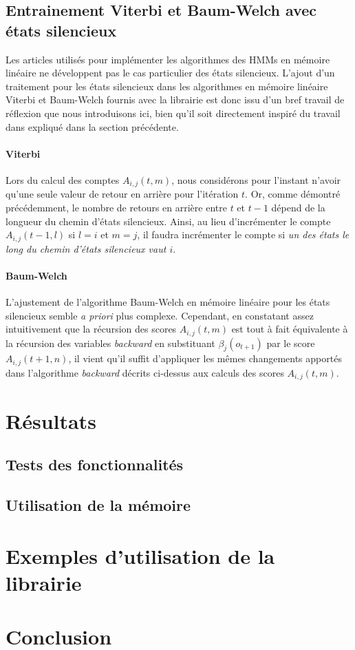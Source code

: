 \documentclass[letterpaper]{article}
\begin{document}
\subsection{Entrainement Viterbi et Baum-Welch avec états silencieux}
Les articles utilisés pour implémenter les algorithmes des HMMs en mémoire linéaire ne développent pas le cas particulier des états silencieux. L'ajout d'un traitement pour les états silencieux dans les algorithmes en mémoire linéaire Viterbi et Baum-Welch fournis avec la librairie est donc issu d'un bref travail de réflexion que nous introduisons ici, bien qu'il soit directement inspiré du travail dans \cite{Durbin} expliqué dans la section précédente.

\paragraph{Viterbi}
Lors du calcul des comptes $A_{i,j}(t, m)$, nous considérons pour l'instant n'avoir qu'une seule valeur de retour en arrière pour l'itération $t$. Or, comme démontré précédemment, le nombre de retours en arrière entre $t$ et $t-1$ dépend de la longueur du chemin d'états silencieux. Ainsi, au lieu d'incrémenter le compte $A_{i,j}(t-1, l)$ si $l=i$ et $m=j$, il faudra incrémenter le compte si \textit{un des états le long du chemin d'états silencieux vaut $i$}. 

\paragraph{Baum-Welch}
L'ajustement de l'algorithme Baum-Welch en mémoire linéaire pour les états silencieux semble \textit{a priori} plus complexe. Cependant, en constatant assez intuitivement que la récursion des scores $A_{i,j}(t, m)$ est tout à fait équivalente à la récursion des variables \textit{backward} en substituant $\beta_j(o_{t+1})$ par le score $A_{i,j}(t+1, n)$, il vient qu'il suffit d'appliquer les mêmes changements apportés dans l'algorithme \textit{backward} décrits ci-dessus aux calculs des scores $A_{i,j}(t, m)$.




\section{Résultats}
\subsection{Tests des fonctionnalités}
\subsection{Utilisation de la mémoire}
\section{Exemples d'utilisation de la librairie}
\section{Conclusion}




\footnotesize


\end{document}
